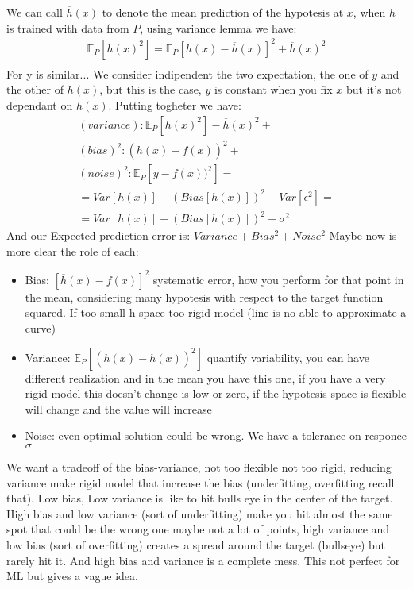 \documentclass[12pt]{book}
\begin{document}
We can call $\overline{h}(x)$ to denote the mean prediction of the hypotesis at $x$, when $h$ is trained with data from $P$, using variance lemma we have:
\begin{equation}
	\begin{aligned}
		\mathbb{E}_P[h(x)^2] = \mathbb{E}_P[h(x) - \overline{h}(x)]^2 + \overline{h}(x)^2\\
	\end{aligned}
\end{equation}
For y is similar...\newline
We consider indipendent the two expectation, the one of $y$ and the other of $h(x)$, but this is the case, $y$ is constant when you fix $x$ but it's not dependant on $h(x)$.\newline
Putting togheter we have:
\begin{equation}
	\begin{align}
		(variance) : \mathbb{E}_P[h(x)^2] - \overline{h}(x)^2 + \\
		(bias)^2 : (\overline{h}(x) - f(x))^2 + \\
		(noise)^2 : \mathbb{E}_P[y - f(x))^2] = \\
		= Var[h(x)] + (Bias[h(x)])^2 + Var[\epsilon^2] = \\
	        = Var[h(x)] + (Bias[h(x)])^2 + \sigma^2
	\end{align}
\end{equation}
And our Expected prediction error is: $Variance + Bias^2 + Noise^2$\newline
Maybe now is more clear the role of each:
\begin{itemize}
	\item Bias: $[\overline{h}(x) - f(x)]^2$ systematic error, how you perform for that point in the mean, considering many hypotesis with respect to the target function squared. If too small h-space too rigid model (line is no able to approximate a curve)
	\item Variance: $\mathbb{E}_P[(h(x) - \overline{h}(x))^2]$ quantify variability, you can have different realization and in the mean you have this one, if you have a very rigid model this doesn't change is low or zero, if the hypotesis space is flexible will change and the value will increase
	\item Noise: even optimal solution could be wrong. We have a tolerance on responce $\sigma$ 
\end{itemize}
We want a tradeoff of the bias-variance, not too flexible not too rigid, reducing variance make rigid model that increase the bias (underfitting, overfitting recall that).\newline
Low bias, Low variance is like to hit bulls eye in the center of the target. High bias and low variance (sort of underfitting) make you hit almost the same spot that could be the wrong one maybe not a lot of points, high variance and low bias (sort of overfitting) creates a spread around the target (bullseye) but rarely hit it. And high bias and variance is a complete mess. This not perfect for ML but gives a vague idea.
\end{document}
